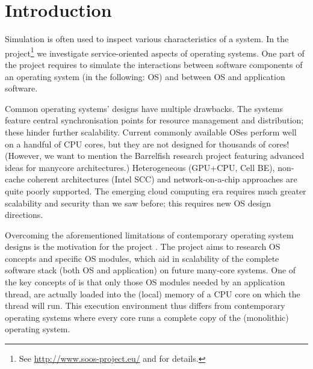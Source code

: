 \section{Introduction}

Simulation is often used to inspect various characteristics of a system.
In the \soos project\footnote{See \url{http://www.soos-project.eu/} and \cite{soos} for details.} we investigate service-oriented aspects of operating systems.
One part of the project requires to simulate the interactions between software components of an operating system (in the following: OS) and between
OS and application software.


Common operating systems' designs have multiple drawbacks.
The systems feature central synchronisation points for resource management and distribution; these hinder further scalability.
Current commonly available OSes perform well on a handful of CPU cores, but they are not designed for thousands of cores!
(However, we want to mention the Barrelfish research project\nolinebreak[4]  \cite{Baumann:2009:MNO:1629575.1629579} featuring advanced ideas for manycore architectures.)
Heterogeneous (\eg GPU+CPU, Cell BE), non-cache coherent architectures (\eg Intel SCC) and network-on-a-chip approaches are quite poorly supported.
The emerging cloud computing era requires much greater scalability and security than we saw before; this requires new OS design directions.

Overcoming the aforementioned limitations of contemporary operating system designs is the motivation for the \soos project \cite{soos}.
The project aims to research OS concepts and specific OS modules, which aid in scalability of the complete software stack (both OS and application) on future many-core systems.
One of the key concepts of \soos is that only those OS modules needed by an application thread, are actually loaded into the (local) memory of a CPU core on which the thread will run.
This execution environment thus differs from contemporary operating systems where every core runs a complete copy of the (monolithic) operating system.

